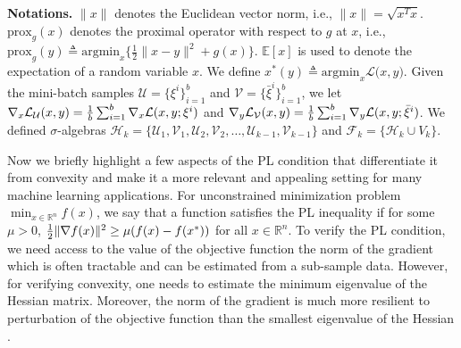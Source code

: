 \documentclass[letterpaper,11 pt]{article}
\def\ml{\mathcal L}
\newcommand{\zizi}[1]{{\color{black}#1}}
\begin{document}
{\bf Notations.} $\|x\|$ denotes the Euclidean vector norm, i.e., $\|x\|=\sqrt{x^Tx}$. $\mbox{prox}_g(x)$ denotes the proximal operator with respect to $g$ at $x$, i.e., $\mbox{prox}_g(y)\triangleq \mbox{argmin}_x\{\tfrac{1}{2}\|x-y\|^2+g(x)\}$. $\mathbb E[x]$ is used to denote the expectation of a random variable $x$. We define $x^*(y)\triangleq \mbox{argmin}_x \ml({x,y)}$. Given the mini-batch samples $ \mathcal U=\{\xi^i\}_{i=1}^b$ and $\mathcal V=\{\bar \xi^i\}_{i=1}^b$, we let $\nabla_x \ml_{\mathcal U}(x,y)={1\over b} \sum_{i=1}^b\nabla_x \ml(x,y;\xi^i)$ and $\nabla_y \ml_{\mathcal V}(x,y)={1\over b} \sum_{i=1}^b\nabla_y \ml(x,y;\bar \xi^i)$. We defined $\sigma$-algebras $\mathcal H_k=\{\mathcal U_1,\mathcal V_1,\mathcal U_2,\mathcal V_2,\hdots,\mathcal U_{k-1}, \mathcal V_{k-1}\}$ and  $\mathcal F_k=\{\mathcal H_k\cup V_k\}$.

Now we briefly highlight a few aspects of the PL condition \cite{polyak1963gradient} that differentiate it from convexity and make it a more relevant and appealing setting for many machine learning applications. 
For unconstrained minimization problem $\min_{x\in \mathbb R^n} f(x)$, we say that a function satisfies the PL inequality if  for some $\mu>0$,
${1\over 2}\|\zizi{\nabla } f(x)\|^2\geq \mu(f(x)-f(x^*))$ for all $x\in \mathbb R^n$.
 To verify the PL condition, we need access to the value of the objective function the norm of the gradient which is often tractable and can be estimated from a sub-sample data. However, for verifying convexity, one needs to estimate the minimum eigenvalue of the Hessian matrix. Moreover, the norm of the gradient is much more resilient to perturbation of the objective function than the smallest eigenvalue of the Hessian \cite{bassily2018exponential}. 
\end{document}
